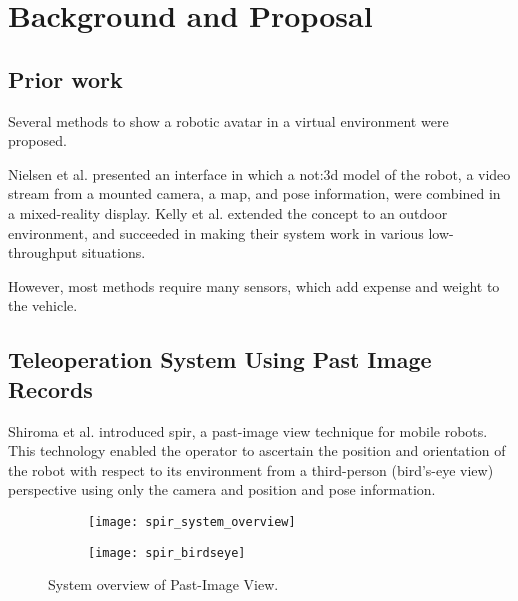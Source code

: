 \chapter{Background and Proposal}
\label{ch:background}

\section{Prior work}
  Several methods to show a robotic avatar in a virtual environment were proposed.

  Nielsen et al. presented an interface in which a \gls{not:3d} model of the robot, a video stream from a mounted camera, a map, and pose information, were combined in a mixed-reality display.\cite{nielsen2007}
  Kelly et al. extended the concept to an outdoor environment, and succeeded in making their system work in various low-throughput situations.\cite{kelly2011}

  However, most methods require many sensors, which add expense and weight to the vehicle.

\section{Teleoperation System Using Past Image Records}
  Shiroma et al. introduced \gls{spir}, a past-image view technique for mobile robots.\cite{shiroma2004}
  This technology enabled the operator to ascertain the position and orientation of the robot with respect to its environment from a third-person (bird's-eye view) perspective using only the camera and position and pose information.

  \begin{figure}[h]
    \centering
    \begin{subfigure}[b]{0.45\textwidth}
      \texttt{[image: spir\_system\_overview]}
    \end{subfigure}
    \hfill
    \begin{subfigure}[b]{0.45\textwidth}
      \texttt{[image: spir\_birdseye]}
    \end{subfigure}
    \caption[\acrshort{spir} system overview]{System overview of Past-Image View.\cite{shiroma2004}}
    \label{fig:spir_system_overview}
  \end{figure}

